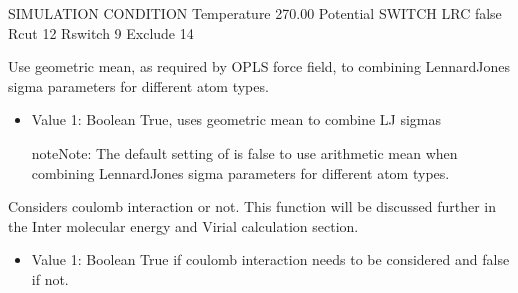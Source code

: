 \documentclass[letterpaper,10pt,english]{sphinxmanual}
\begin{document}
\begin{description}
\begin{itemize}
\begin{description}
\begin{sphinxVerbatim}[commandchars=\\\{\}]
\PYGZsh{}\PYGZsh{}\PYGZsh{}\PYGZsh{}\PYGZsh{}\PYGZsh{}\PYGZsh{}\PYGZsh{}\PYGZsh{}\PYGZsh{}\PYGZsh{}\PYGZsh{}\PYGZsh{}\PYGZsh{}\PYGZsh{}\PYGZsh{}\PYGZsh{}\PYGZsh{}\PYGZsh{}\PYGZsh{}\PYGZsh{}\PYGZsh{}\PYGZsh{}\PYGZsh{}\PYGZsh{}\PYGZsh{}\PYGZsh{}\PYGZsh{}\PYGZsh{}\PYGZsh{}\PYGZsh{}\PYGZsh{}\PYGZsh{}
\PYGZsh{} SIMULATION CONDITION
\PYGZsh{}\PYGZsh{}\PYGZsh{}\PYGZsh{}\PYGZsh{}\PYGZsh{}\PYGZsh{}\PYGZsh{}\PYGZsh{}\PYGZsh{}\PYGZsh{}\PYGZsh{}\PYGZsh{}\PYGZsh{}\PYGZsh{}\PYGZsh{}\PYGZsh{}\PYGZsh{}\PYGZsh{}\PYGZsh{}\PYGZsh{}\PYGZsh{}\PYGZsh{}\PYGZsh{}\PYGZsh{}\PYGZsh{}\PYGZsh{}\PYGZsh{}\PYGZsh{}\PYGZsh{}\PYGZsh{}\PYGZsh{}\PYGZsh{}
Temperature   270.00
Potential     SWITCH
LRC           false
Rcut          12
Rswitch       9
Exclude       1\PYGZhy{}4
\end{sphinxVerbatim}

\end{description}

\end{itemize}

\item[{\sphinxcode{\sphinxupquote{VDWGeometricSigma}}}] \leavevmode
Use geometric mean, as required by OPLS force field, to combining Lennard\sphinxhyphen{}Jones sigma parameters for different atom types.
\begin{itemize}
\item {} 
Value 1: Boolean \sphinxhyphen{} True, uses geometric mean to combine L\sphinxhyphen{}J sigmas

\begin{sphinxadmonition}{note}{Note:}
The default setting of  is false to use arithmetic mean when combining Lennard\sphinxhyphen{}Jones sigma parameters for different atom types.
\end{sphinxadmonition}

\end{itemize}

\item[{\sphinxcode{\sphinxupquote{ElectroStatic}}}] \leavevmode
Considers coulomb interaction or not. This function will be discussed further in the Inter\sphinxhyphen{} molecular energy and Virial calculation section.
\begin{itemize}
\item {} 
Value 1: Boolean \sphinxhyphen{} True if coulomb interaction needs to be considered and false if not.


\end{itemize}
\end{description}
\end{document}
